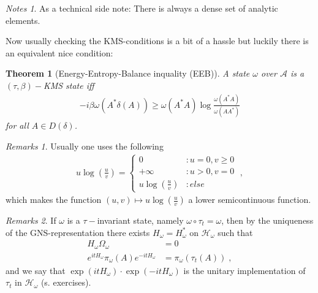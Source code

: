 \documentclass[
a4paper, %
11pt, %
onecolumn, %
openany, %
]{memoir}
\theoremstyle{definition}
\theoremstyle{remark}
\newtheorem{remarks}{Remarks}[chapter]
\newtheorem{notes}{Notes}[chapter]
\theoremstyle{plain}
\newtheorem{theorem}{Theorem}[chapter]
\begin{document}
\begin{notes}
As a technical side note: There is always a dense set of analytic elements.
\end{notes}
Now usually checking the KMS-conditions is a bit of a hassle but luckily there is an equivalent nice condition: \begin{theorem}[Energy-Entropy-Balance inquality (EEB)]
	A state $\omega$ over $\mathcal{A}$ is a $(\tau,\beta)-$KMS state iff\begin{align} -i\beta\omega(A^*\delta(A))\geq \omega(A^*A)\log \frac{\omega(A^*A)}{\omega(AA^*)}\end{align}
	for all $A\in D(\delta)$.
\end{theorem}
\begin{remarks}
	Usually one uses the following \begin{align}
	u\log\left(\frac{u}{v}\right)=\begin{cases}
	0&\colon u=0, v\geq 0\\
	+\infty &\colon u> 0, v=0\\
	u\log\left(\frac{u}{v}\right)&\colon else
	\end{cases}\; ,
	\end{align}
	which makes the function $(u,v)\mapsto u\log\left(\frac{u}{v}\right)$ a lower semicontinuous function.
\end{remarks}
\begin{remarks}
	If $\omega$ is a $\tau-$invariant state, namely $\omega\circ \tau_t=\omega$, then by the uniqueness of the GNS-representation there exists $H_{\omega}=H_{\omega}^*$ on $\mathcal{H}_{\omega}$ such that \begin{align}
		H_{\omega}\Omega_{\omega}&=0\\
		e^{itH_{\omega}}\pi_{\omega}(A)e^{-itH_{\omega}}&=\pi_{\omega}(\tau_t(A))\;,
		\end{align}
		and we say that $\exp(itH_{\omega})\cdot \exp(-itH_{\omega})$ is the unitary implementation of $\tau_t$ in $\mathcal{H}_{\omega}$ (s. exercises). 
\end{remarks}		
\end{document}

